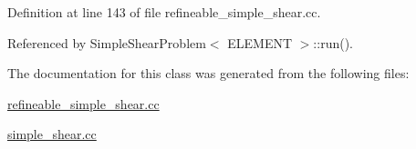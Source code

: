Definition at line 143 of file refineable\+\_\+simple\+\_\+shear.\+cc.



Referenced by Simple\+Shear\+Problem$<$ E\+L\+E\+M\+E\+N\+T $>$\+::run().



The documentation for this class was generated from the following files\+:\begin{DoxyCompactItemize}
\item 
\hyperlink{refineable__simple__shear_8cc}{refineable\+\_\+simple\+\_\+shear.\+cc}\item 
\hyperlink{simple__shear_8cc}{simple\+\_\+shear.\+cc}\end{DoxyCompactItemize}
